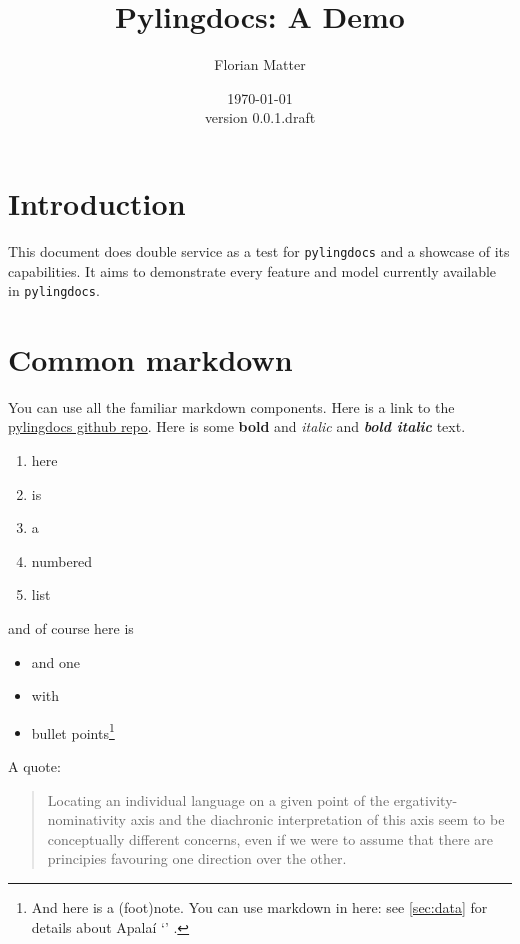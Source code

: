 \documentclass{article}
\title{Pylingdocs: A Demo}
\author{Florian Matter}
\date{\today\\version 0.0.1.draft}
\begin{document}
\maketitle

\tableofcontents


\section{\texorpdfstring{Introduction \label{sec:intro}}{Introduction }}

This document does double service as a test for \texttt{pylingdocs} and
a showcase of its capabilities. It aims to demonstrate every feature and
model currently available in \texttt{pylingdocs}.

\section{Common markdown}

You can use all the familiar markdown components. Here is a link to the
\href{https://github.com/fmatter/pylingdocs/}{pylingdocs github repo}.
Here is some \textbf{bold} and \emph{italic} and \textbf{\emph{bold
italic}} text.

\begin{enumerate}
\def\labelenumi{\arabic{enumi}.}
\tightlist
\item
  here
\item
  is
\item
  a
\item
  numbered
\item
  list
\end{enumerate}

and of course here is

\begin{itemize}
\tightlist
\item
  and one
\item
  with
\item
  bullet points\footnote{And here is a (foot)note. You can use markdown
    in here: see \cref{sec:data} for details about Apalaí 
    `' \parencites[77]{koehn1986apalai}.}
\end{itemize}

A quote:

\begin{quote}
Locating an individual language on a given point of the
ergativity-nominativity axis and the diachronic interpretation of this
axis seem to be conceptually different concerns, even if we were to
assume that there are principies favouring one direction over the other.
\parencites[71]{alvarez1998split}
\end{quote}
\end{document}
